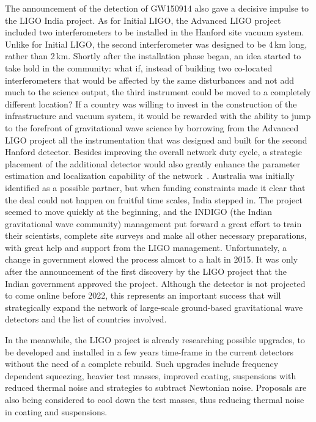 The announcement of the detection of GW150914 also gave a decisive impulse to the LIGO India project.
As for Initial LIGO, the Advanced LIGO project included two interferometers to be installed in the Hanford site vacuum system.
Unlike for Initial LIGO, the second interferometer was designed to be 4\,km long, rather than 2\,km. 
Shortly after the installation phase began, an idea started to take hold in the community: what if, instead of building two co-located interferometers that would be affected by the same disturbances and not add much to the science output, the third instrument could be moved to a completely different location? 
If a country was willing to invest in the construction of the infrastructure and vacuum system, it would be rewarded with the ability to jump to the forefront of gravitational wave science by borrowing from the Advanced LIGO project all the instrumentation that was designed and built for the second Hanford detector. 
Besides improving the overall network duty cycle, a strategic placement of the additional detector would also greatly enhance the parameter estimation and localization capability of the network~\cite{Klimenko_2016}.
Australia was initially identified as a possible partner, but when funding constraints made it clear that the deal could not happen on fruitful time scales, India stepped in.
The project seemed to move quickly at the beginning, and the INDIGO (the Indian gravitational wave community) management put forward a great effort to train their scientists, complete site surveys and make all other necessary preparations, with great help and support from the LIGO management. 
Unfortunately, a change in government slowed the process almost to a halt in 2015. 
It was only after the announcement of the first discovery by the LIGO project that the Indian government approved the project. 
Although the detector is not projected to come online before 2022, this represents an important success that will strategically expand the network of large-scale ground-based gravitational wave detectors and the list of countries involved.

In the meanwhile, the LIGO project is already researching possible upgrades, to be developed and installed in a few years time-frame in the current detectors without the need of a complete rebuild.
Such upgrades include frequency dependent squeezing, heavier test masses, improved coating, suspensions with reduced thermal noise and strategies to subtract Newtonian noise.
Proposals are also being considered to cool down the test masses, thus reducing thermal noise in coating and suspensions. 

